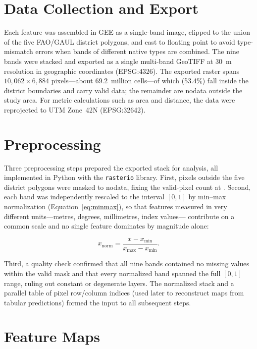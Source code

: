 \section{Data Collection and Export}
\label{sec:collection}

Each feature was assembled in GEE as a single-band image, clipped to the union
of the five FAO/GAUL district polygons, and cast to floating point to avoid
type-mismatch errors when bands of different native types are combined. The nine
bands were stacked and exported as a single multi-band GeoTIFF at 30~m
resolution in geographic coordinates (EPSG:4326). The exported raster spans
$10{,}062 \times 6{,}884$ pixels---about 69.2~million cells---of which
\npixels{} (53.4\%) fall inside the district boundaries and carry valid data;
the remainder are nodata outside the study area. For metric calculations such as
area and distance, the data were reprojected to UTM Zone~42N (EPSG:32642).

\section{Preprocessing}
\label{sec:preprocessing}

Three preprocessing steps prepared the exported stack for analysis, all
implemented in Python with the \texttt{rasterio} library. First, pixels outside
the five district polygons were masked to nodata, fixing the valid-pixel count at
\npixels{}. Second, each band was independently rescaled to the interval
$[0,1]$ by min--max normalization (Equation~\ref{eq:minmax}), so that features
measured in very different units---metres, degrees, millimetres, index values---
contribute on a common scale and no single feature dominates by magnitude alone:

\begin{equation}
  x_{\text{norm}} = \frac{x - x_{\min}}{x_{\max} - x_{\min}}.
  \label{eq:minmax}
\end{equation}

Third, a quality check confirmed that all nine bands contained no missing values
within the valid mask and that every normalized band spanned the full $[0,1]$
range, ruling out constant or degenerate layers. The normalized stack and a
parallel table of pixel row/column indices (used later to reconstruct maps from
tabular predictions) formed the input to all subsequent steps.

\section{Feature Maps}
\label{sec:feature_maps}

